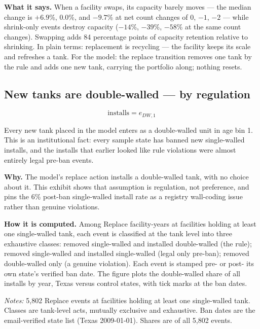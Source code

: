 \documentclass[
  letterpaper,
  DIV=11,
  numbers=noendperiod]{scrartcl}
\begin{document}
\textbf{What it says.} When a facility swaps, its capacity barely moves
--- the median change is \(+6.9\)\%, \(0.0\)\%, and \(-9.7\)\% at net
count changes of 0, \(-1\), \(-2\) --- while shrink-only events destroy
capacity (\(-14\)\%, \(-39\)\%, \(-58\)\% at the same count changes).
Swapping adds 84 percentage points of capacity retention relative to
shrinking. In plain terms: replacement is recycling --- the facility
keeps its scale and refreshes a tank. For the model: the replace
transition removes one tank by the rule and adds one new tank, carrying
the portfolio along; nothing resets.

\subsection{New tanks are double-walled --- by
regulation}\label{sec-ae-x9}

\[
\text{installs} = e_{DW,1}
\]

Every new tank placed in the model enters as a double-walled unit in age
bin 1. This is an institutional fact: every sample state has banned new
single-walled installs, and the installs that earlier looked like rule
violations were almost entirely legal pre-ban events.

\textbf{Why.} The model's replace action installs a double-walled tank,
with no choice about it. This exhibit shows that assumption is
regulation, not preference, and pins the 6\% post-ban single-walled
install rate as a registry wall-coding issue rather than genuine
violations.

\textbf{How it is computed.} Among Replace facility-years at facilities
holding at least one single-walled tank, each event is classified at the
tank level into three exhaustive classes: removed single-walled and
installed double-walled (the rule); removed single-walled and installed
single-walled (legal only pre-ban); removed double-walled only (a
genuine violation). Each event is stamped pre- or post- its own state's
verified ban date. The figure plots the double-walled share of all
installs by year, Texas versus control states, with tick marks at the
ban dates.

\begin{table}[H]
\centering
\caption{Replacement install decomposition by ban timing}

\par\vspace{4pt}
{\footnotesize\textit{Notes:} 5,802 Replace events at facilities holding at
least one single-walled tank. Classes are tank-level acts, mutually exclusive
and exhaustive. Ban dates are the email-verified state list (Texas
2009-01-01). Shares are of all 5,802 events.\par}
\end{table}
\end{document}
